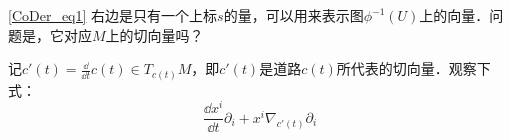 \autoref{CoDer_eq1} 右边是只有一个上标$s$的量，可以用来表示图$\phi^{-1}(U)$上的向量．问题是，它对应$M$上的切向量吗？

记$c'(t)=\frac{\dd}{\dd t}c(t)\in T_{c(t)}M$，即$c'(t)$是道路$c(t)$所代表的切向量．观察下式：
\begin{equation}
\frac{\dd x^i}{\dd t}\partial_i+x^i\nabla_{c'(t)}\partial_i
\end{equation}
















